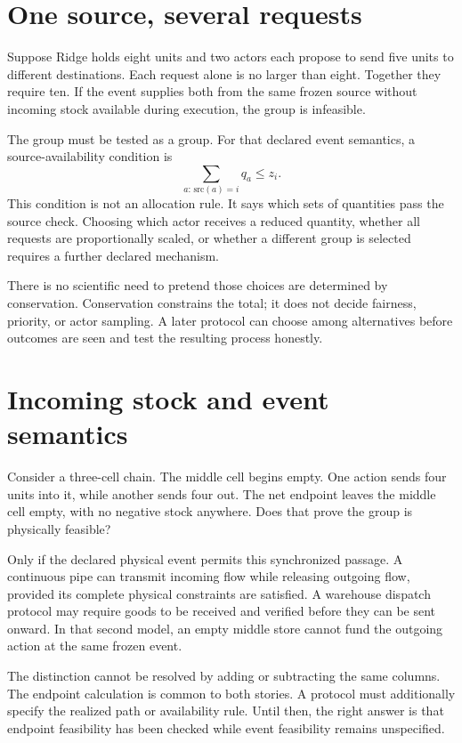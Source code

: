 \section{One source, several requests}
Suppose Ridge holds eight units and two actors each propose to send five units to different destinations. Each request alone is no larger than eight. Together they require ten. If the event supplies both from the same frozen source without incoming stock available during execution, the group is infeasible.

The group must be tested as a group. For that declared event semantics, a source-availability condition is
\begin{equation}
 \sum_{a:\,\mathrm{src}(a)=i}q_a\leq z_i.
\end{equation}
This condition is not an allocation rule. It says which sets of quantities pass the source check. Choosing which actor receives a reduced quantity, whether all requests are proportionally scaled, or whether a different group is selected requires a further declared mechanism.

There is no scientific need to pretend those choices are determined by conservation. Conservation constrains the total; it does not decide fairness, priority, or actor sampling. A later protocol can choose among alternatives before outcomes are seen and test the resulting process honestly.

\section{Incoming stock and event semantics}
Consider a three-cell chain. The middle cell begins empty. One action sends four units into it, while another sends four out. The net endpoint leaves the middle cell empty, with no negative stock anywhere. Does that prove the group is physically feasible?

Only if the declared physical event permits this synchronized passage. A continuous pipe can transmit incoming flow while releasing outgoing flow, provided its complete physical constraints are satisfied. A warehouse dispatch protocol may require goods to be received and verified before they can be sent onward. In that second model, an empty middle store cannot fund the outgoing action at the same frozen event.

The distinction cannot be resolved by adding or subtracting the same columns. The endpoint calculation is common to both stories. A protocol must additionally specify the realized path or availability rule. Until then, the right answer is that endpoint feasibility has been checked while event feasibility remains unspecified.

